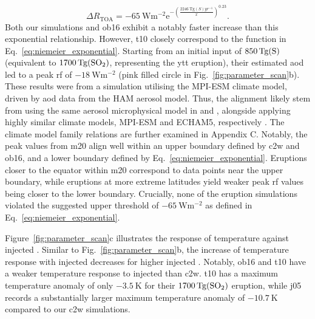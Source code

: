 \documentclass{ametsocV6.1}
\newcommand{\iso}[1][i]{{#1}njected \ce{SO2}}
\begin{document}
\begin{equation}
  \Delta
  R_{\mathrm{TOA}} =
  -\SI{65}{\watt\metre^{-2}}
  \mathrm{e}^{-{\left(\frac{\SI{2246}{\tera\gram(S)yr^{-1}}}{x}\right)}^{0.23}}.
  \label{eq:niemeier_exponential}
\end{equation}
%
Both our simulations and \gls{ob16} exhibit a notably faster increase than this
exponential relationship. However, \gls{t10} closely correspond to the function in
Eq.~\ref{eq:niemeier_exponential}. Starting from an initial input of
\(\SI{850}{\tera\gram(\ce{S})}\) (equivalent to \(\SI{1700}{\tera\gram(\ce{SO2})}\),
representing the \gls{ytt} eruption), their estimated \gls{aod} led to a peak \gls{rf}
of \(\SI{-18}{\watt\metre^{-2}}\) (pink filled circle in
Fig.~\ref{fig:parameter_scan}b). These results were from a simulation utilising the
MPI-ESM climate model, driven by \gls{aod} data from the HAM aerosol model. Thus, the
alignment likely stem from using the same aerosol microphysical model in
\citet{timmreck2010} and \citet{niemeier2015}, alongside applying highly similar climate
models, MPI-ESM and ECHAM5, respectively \citep{kuma2023}. The climate model family
relations are further examined in Appendix C. Notably, the peak values from \gls{m20}
align well within an upper boundary defined by \gls{c2w} and \gls{ob16}, and a lower
boundary defined by Eq.~\ref{eq:niemeier_exponential}. Eruptions closer to the equator
within \gls{m20} correspond to data points near the upper boundary, while eruptions at
more extreme latitudes yield weaker peak \gls{rf} values being closer to the lower
boundary. Crucially, none of the eruption simulations violated the suggested upper
threshold of \(\SI{-65}{\watt\metre^{-2}}\) as defined in
Eq.~\ref{eq:niemeier_exponential}.

Figure~\ref{fig:parameter_scan}c illustrates the response of temperature against \iso{}.
Similar to Fig.~\ref{fig:parameter_scan}b, the increase of temperature response with
\iso{} decreases for higher \iso{}. 
Notably, \gls{ob16} and \gls{t10} have a weaker temperature response to \iso{} than \gls{c2w}. 
\gls{t10} has a maximum temperature anomaly of only \(\SI{-3.5}{\kelvin}\) for their
\(\SI{1700}{\tera\gram(\ce{SO2})}\) eruption, while \gls{j05} records a substantially
larger maximum temperature anomaly of \(\SI{-10.7}{\kelvin}\) compared to our \gls{c2w}
simulations.
\end{document}
